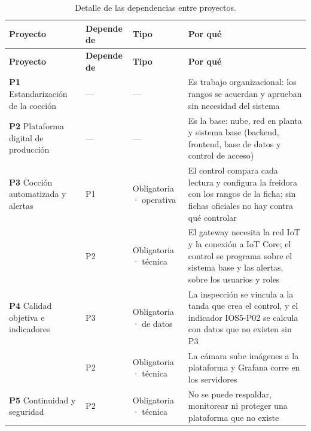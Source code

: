 \begingroup
{}
\renewcommand{\arraystretch}{1.3}
\setlength{\tabcolsep}{4pt}
\small
\begin{longtable}{|L{3.2cm}|C{1.8cm}|L{2.4cm}|L{6.6cm}|}
  \hline
  {\color{white}\bfseries Proyecto} &
  {\color{white}\bfseries Depende de} &
  {\color{white}\bfseries Tipo} &
  {\color{white}\bfseries Por qué} \\ \hline
  \endfirsthead
  \hline
  {\color{white}\bfseries Proyecto} &
  {\color{white}\bfseries Depende de} &
  {\color{white}\bfseries Tipo} &
  {\color{white}\bfseries Por qué} \\ \hline
  \endhead
  \endfoot
  \caption{Detalle de las dependencias entre proyectos.}
  \label{tab:f_dependencias}
  \endlastfoot
  \textbf{P1} Estandarización de la cocción & --- & --- & Es trabajo organizacional: los rangos se acuerdan y aprueban sin necesidad del sistema \\ \hline
  \textbf{P2} Plataforma digital de producción & --- & --- & Es la base: nube, red en planta y sistema base (backend, frontend, base de datos y control de acceso) \\ \hline
  \textbf{P3} Cocción automatizada y alertas & P1 & Obligatoria · operativa & El control compara cada lectura y configura la freidora con los rangos de la ficha; sin fichas oficiales no hay contra qué controlar \\ \hline
   & P2 & Obligatoria · técnica & El gateway necesita la red IoT y la conexión a IoT Core; el control se programa sobre el sistema base y las alertas, sobre los usuarios y roles \\ \hline
  \textbf{P4} Calidad objetiva e indicadores & P3 & Obligatoria · de datos & La inspección se vincula a la tanda que crea el control, y el indicador IOS5-P02 se calcula con datos que no existen sin P3 \\ \hline
   & P2 & Obligatoria · técnica & La cámara sube imágenes a la plataforma y Grafana corre en los servidores \\ \hline
  \textbf{P5} Continuidad y seguridad & P2 & Obligatoria · técnica & No se puede respaldar, monitorear ni proteger una plataforma que no existe \\ \hline
\end{longtable}
\endgroup

